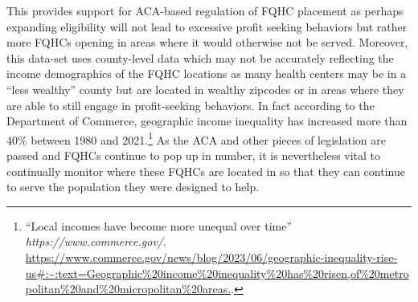 \documentclass[12pt, ]{article}
\newenvironment{CSLReferences}[2]{

\clearpage
}{}
\begin{document}
This provides support for ACA-based regulation of FQHC placement as
perhaps expanding eligibility will not lead to excessive profit seeking
behaviors but rather more FQHCs opening in areas where it would
otherwise not be served. Moreover, this data-set uses county-level data
which may not be accurately reflecting the income demographics of the
FQHC locations as many health centers may be in a ``less wealthy''
county but are located in wealthy zipcodes or in areas where they are
able to still engage in profit-seeking behaviors. In fact according to
the Department of Commerce, geographic income inequality has increased
more than 40\% between 1980 and 2021.\footnote{``Local incomes have
  become more unequal over time'' \emph{https://www.commerce.gov/}.
  \url{https://www.commerce.gov/news/blog/2023/06/geographic-inequality-rise-us\#:~:text=Geographic\%20income\%20inequality\%20has\%20risen,of\%20metropolitan\%20and\%20micropolitan\%20areas.}.}
As the ACA and other pieces of legislation are passed and FQHCs continue
to pop up in number, it is nevertheless vital to continually monitor
where these FQHCs are located in so that they can continue to serve the
population they were designed to help.

\hypertarget{refs}{}

\begin{CSLReferences}{0}{0}\end{CSLReferences}


\end{document}
